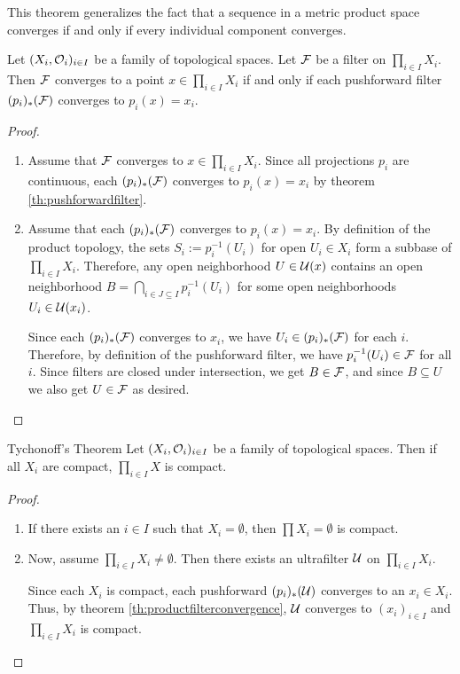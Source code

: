 This theorem generalizes the fact that a sequence in a metric product space converges if and only if every individual component converges.
\begin{theorem}
	\label{th:productfilterconvergence}
	Let $(X_i, \mathcal{O}_i)_{i \in I}$ be a family of topological spaces. Let $\mathcal{F}$ be a filter on $\prod_{i \in I} X_i$. Then $\mathcal{F}$ converges to a point $x \in \prod_{i \in I} X_i$ if and only if each pushforward filter $(p_i)_*(\mathcal{F})$ converges to $p_i(x) = x_i$.
\end{theorem}
\begin{proof}
	\begin{enumerate}
		\item[$\Rightarrow$:] Assume that $\mathcal{F}$ converges to $x \in \prod_{i \in I} X_i$. Since all projections $p_i$ are continuous, each $(p_i)_*(\mathcal{F})$ converges to $p_i(x) = x_i$ by theorem \ref{th:pushforwardfilter}.
		
		\item[$\Leftarrow$:] Assume that each $(p_i)_*(\mathcal{F})$ converges to $p_i(x) = x_i$. By definition of the product topology, the sets $S_i := p_i^{-1}(U_i)$ for open $U_i \in X_i$ form a subbase of $\prod_{i \in I} X_i$. Therefore, any open neighborhood $U \in \mathcal{U}(x)$ contains an open neighborhood $B = \bigcap_{i \in J \subseteq I} p_i^{-1}(U_i)$ for some open neighborhoods $U_i \in \mathcal{U}(x_i)$.
		
		Since each $(p_i)_*(\mathcal{F})$ converges to $x_i$, we have $U_i \in (p_i)_*(\mathcal{F})$ for each $i$. Therefore, by definition of the pushforward filter, we have $p_i^{-1}(U_i) \in \mathcal{F}$ for all $i$. Since filters are closed under intersection, we get $B \in \mathcal{F}$, and since $B \subseteq U$ we also get $U \in \mathcal{F}$ as desired.
	\end{enumerate}
\end{proof}
\begin{importanttheorem}{Tychonoff's Theorem}{}{}
	Let $(X_i, \mathcal{O}_i)_{i \in I}$ be a family of topological spaces. Then if all $X_i$ are compact, $\prod_{i \in I} X$ is compact.
\end{importanttheorem}
\begin{proof}
	\begin{enumerate}
		\item If there exists an $i \in I$ such that $X_i = \emptyset$, then $\prod X_i = \emptyset$ is compact.
		\item Now, assume $\prod_{i \in I} X_i \neq \emptyset$. Then there exists an ultrafilter $\mathcal{U}$ on $\prod_{i \in I} X_i$. 
		
		Since each $X_i$ is compact, each pushforward $(p_i)_*(\mathcal{U})$ converges to an $x_i \in X_i$. Thus, by theorem \ref{th:productfilterconvergence}, $\mathcal{U}$ converges to $(x_i)_{i \in I}$ and $\prod_{i \in I} X_i$ is compact.
	\end{enumerate}
\end{proof}
